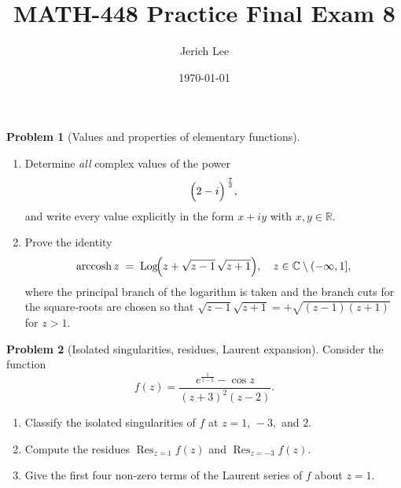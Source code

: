 \documentclass[12pt]{article}
\title{MATH-448 Practice Final Exam 8}
\author{Jerich Lee}
\date{\today}
\DeclareMathOperator{\Log}{Log}
\theoremstyle{definition} %
\newtheorem{problem}{Problem}
\theoremstyle{plain} %
\begin{document}
\maketitle
\pagebreak


  

  \begin{problem}[Values and properties of elementary functions]
  \begin{enumerate}[label=(\alph*),itemsep=6pt]
  
    \item  Determine \emph{all} complex values of the power
          \[
            \Bigl(2 - i\Bigr)^{\,\frac{7}{3}},
          \]
          and write every value explicitly in the form $x+iy$ with $x,y\in\mathbb{R}$.
  
    \item  Prove the identity
          \[
            \operatorname{arccosh}z
            \;=\;
            \Log\!\Bigl(z+\sqrt{z-1}\,\sqrt{z+1}\Bigr),
            \quad z\in\mathbb{C}\setminus(-\infty,1],
          \]
          where the principal branch of the logarithm is taken and the branch cuts for the square‑roots are chosen so that
          $\sqrt{z-1}\sqrt{z+1}=+\sqrt{(z-1)(z+1)}$ for $z>1$.
  
  \end{enumerate}
  \end{problem}
  
  \pagebreak
  \begin{problem}[Isolated singularities, residues, Laurent expansion]
  Consider the function  
  \[
    f(z)=\frac{e^{\frac{1}{z-1}}-\cos z}{(z+3)^{2}(z-2)}.
  \]
  \begin{enumerate}[label=(\alph*),itemsep=6pt]
    \item  Classify the isolated singularities of $f$ at $z=1,\,-3,$ and $2$.
    \item  Compute the residues $\operatorname*{Res}_{z=1}f(z)$ and
           $\operatorname*{Res}_{z=-3}f(z)$.
    \item  Give the first four non‑zero terms of the Laurent series of $f$
           about $z=1$.
  \end{enumerate}
  \end{problem}
  
\end{document}
